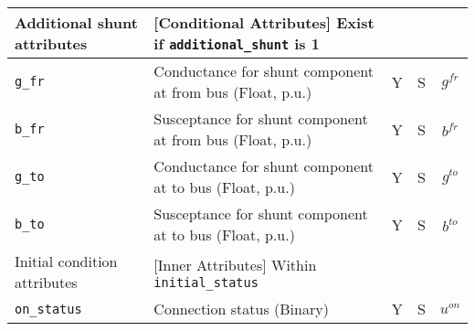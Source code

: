 \documentclass{article}
\begin{document}
\begin{center}
\begin{tabular}{ l | l | c | c | c | }
  \hline
  Additional shunt attributes & [Conditional Attributes] Exist if {\tt additional\_shunt} is 1 &  & & \\
  \hline
  {\tt g\_fr} & Conductance for shunt component at from bus (Float, p.u.)& Y & S & $g^{fr}$\\
  {\tt b\_fr} & Susceptance for shunt component at from bus (Float, p.u.)& Y & S & $b^{fr}$\\
  {\tt g\_to} & Conductance for shunt component at to bus (Float, p.u.)& Y & S & $g^{to}$\\
  {\tt b\_to} & Susceptance for shunt component at to bus (Float, p.u.)& Y & S & $b^{to}$\\
  \hline
  Initial condition attributes & [Inner Attributes] Within {\tt initial\_status} & & & \\
  \hline
  {\tt on\_status} & Connection status (Binary) & Y & S & $u^{on}$ \\
  \hline
\end{tabular}
\end{center}


\end{document}
